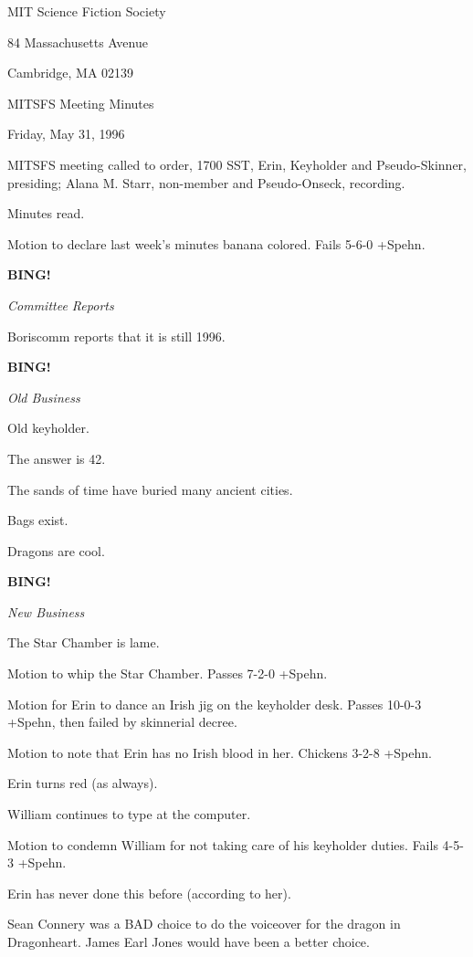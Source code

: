 \documentclass[12pt]{article}
\newcommand{\bing}{{\bf BING!} }
\newcommand{\goto}[1]{\bing \vskip 12pt \centerline{{\em{#1}}}}
\begin{document}
\begin{center}

MIT Science Fiction Society 

84 Massachusetts Avenue

Cambridge, MA 02139

\vspace{12pt}

MITSFS Meeting Minutes 

Friday, May 31, 1996

\end{center}
 
\vspace{18pt}

\setlength{\parskip}{6pt}

\noindent
MITSFS meeting called to order, 1700 SST,
Erin, Keyholder and Pseudo-Skinner, presiding; Alana M. Starr, non-member and Pseudo-Onseck, recording.

Minutes read.

Motion to declare last week's minutes banana colored. Fails 5-6-0 +Spehn.

\goto{Committee Reports}

Boriscomm reports that it is still 1996.

\goto{Old Business}

Old keyholder.

The answer is 42.

The sands of time have buried many ancient cities.

Bags exist.

Dragons are cool.

\goto{New Business}

The Star Chamber is lame.

Motion to whip the Star Chamber. Passes 7-2-0 +Spehn.

Motion for Erin to dance an Irish jig on the keyholder desk. Passes 10-0-3 +Spehn, then failed by skinnerial decree.

Motion to note that Erin has no Irish blood in her. Chickens 3-2-8 +Spehn.

Erin turns red (as always).

William continues to type at the computer.

Motion to condemn William for not taking care of his keyholder duties. Fails 4-5-3 +Spehn.

Erin has never done this before (according to her).

Sean Connery was a BAD choice to do the voiceover for the dragon in Dragonheart. James Earl Jones would have been a better choice.
\end{document}
